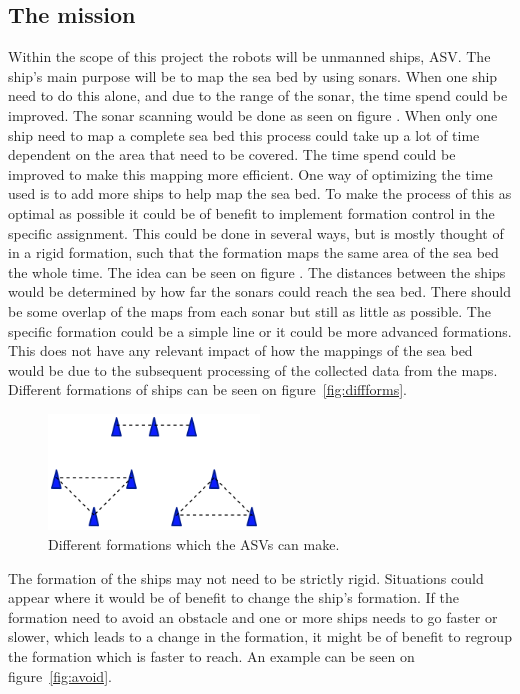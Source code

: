 \subsection{The mission}
Within the scope of this project the robots will be unmanned ships, \ac{ASV}. The ship's main purpose will be to map the sea bed by using sonars. When one ship need to do this alone, and due to the range of the sonar, the time spend could be improved. The sonar scanning would be done as seen on figure . When only one ship need to map a complete sea bed this process could take up a lot of time dependent on the area that need to be covered. The time spend could be improved to make this mapping more efficient. One way of optimizing the time used is to add more ships to help map the sea bed. To make the process of this as optimal as possible it could be of benefit to implement formation control in the specific assignment. This could be done in several ways, but is mostly thought of in a rigid formation, such that the formation maps the same area of the sea bed the whole time. The idea can be seen on figure . The distances between the ships would be determined by how far the sonars could reach the sea bed. There should be some overlap of the maps from each sonar but still as little as possible. The specific formation could be a simple line or it could be more advanced formations. This does not have any relevant impact of how the mappings of the sea bed would be due to the subsequent processing of the collected data from the maps. Different formations of ships can be seen on figure~\vref{fig:diffforms}.
\begin{figure}[htbp]
	\centering
	\includegraphics[width=0.5\textwidth]{fig/diffforms}
	\caption{Different formations which the \ac{ASV}s can make.}
	\label{fig:diffforms}
\end{figure}
The formation of the ships may not need to be strictly rigid. Situations could appear where it would be of benefit to change the ship's formation. If the formation need to avoid an obstacle and one or more ships needs to go faster or slower, which leads to a change in the formation, it might be of benefit to regroup the formation which is faster to reach. An example can be seen on figure~\vref{fig:avoid}.
